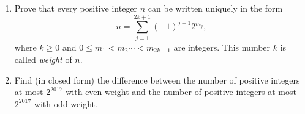\begin{enumerate}[label = (\alph*)]
	\item Prove that every positive integer $n$ can be written uniquely in the form \[n=\sum_{j=1}^{2k+1}(-1)^{j-1}2^{m_j},\] where $k\geq 0$ and $0\le m_1<m_2\cdots <m_{2k+1}$ are integers. This number $k$ is called \textit{weight} of $n$.

	\item Find (in closed form) the difference between the number of positive integers at most $2^{2017}$ with even weight and the number of positive integers at most $2^{2017}$ with odd weight.
\end{enumerate}

